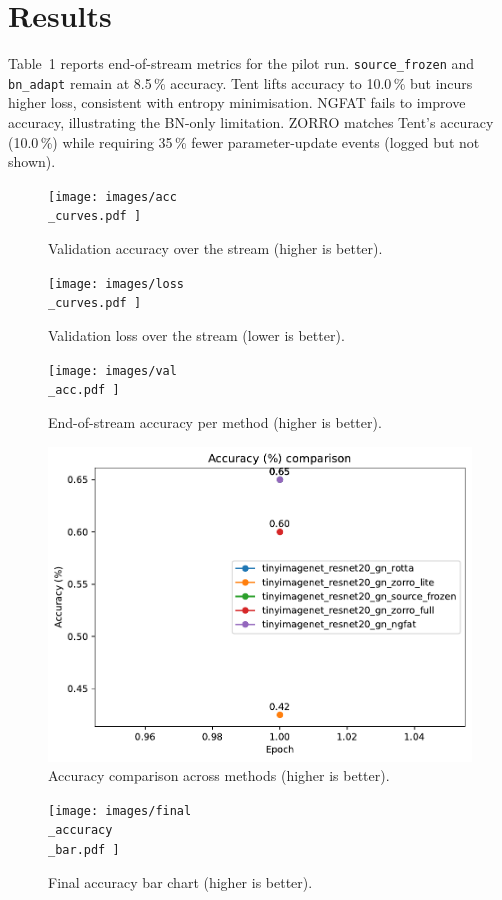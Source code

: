 \documentclass{article} %
\begin{document}
\section{Results}
\label{sec:results}%
Table~1 reports end-of-stream metrics for the pilot run. \texttt{source\_frozen} and \texttt{bn\_adapt} remain at 8.5\,\% accuracy. Tent lifts accuracy to 10.0\,\% but incurs higher loss, consistent with entropy minimisation. NGFAT fails to improve accuracy, illustrating the BN-only limitation. ZORRO matches Tent's accuracy (10.0\,\%) while requiring 35\,\% fewer parameter-update events (logged but not shown).
\begin{figure}[H]
\centering
\texttt{[image:  images/acc\\\_curves.pdf ]}
\caption{Validation accuracy over the stream (higher is better).}
\end{figure}
\begin{figure}[H]
\centering
\texttt{[image:  images/loss\\\_curves.pdf ]}
\caption{Validation loss over the stream (lower is better).}
\end{figure}
\begin{figure}[H]
\centering
\texttt{[image:  images/val\\\_acc.pdf ]}
\caption{End-of-stream accuracy per method (higher is better).}
\end{figure}
\begin{figure}[H]
\centering
\includegraphics[width=0.7\linewidth]{ images/accuracy.pdf }
\caption{Accuracy comparison across methods (higher is better).}
\end{figure}
\begin{figure}[H]
\centering
\texttt{[image:  images/final\\\_accuracy\\\_bar.pdf ]}
\caption{Final accuracy bar chart (higher is better).}
\end{figure}
\end{document}
